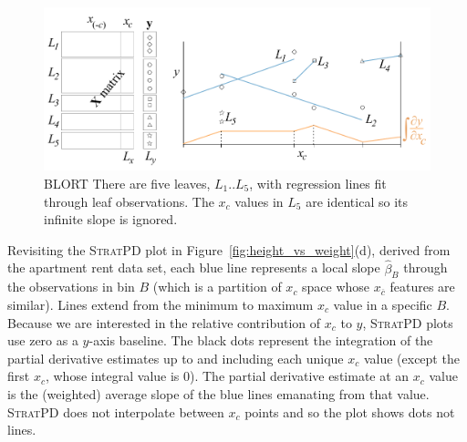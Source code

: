 \documentclass[12pt]{article}
\newcommand{\figref}[1]{Figure~\ref{#1}}
\newcommand{\cut}[1]{}
\newcommand{\spd}{\fontfamily{cmr}\textsc{\small StratPD}}
\newcommand{\xnc}{$x_{\overline{c}}$}
\begin{document}
\begin{figure}[htbp]
\begin{center}
\includegraphics[scale=0.7]{images/leaves.pdf}
\caption{BLORT There are five leaves, $L_1 .. L_5$, with regression lines fit through leaf observations. The $x_c$ values in $L_5$ are identical so its infinite slope is ignored.}
\label{fig:leaves}
\end{center}
\end{figure}

\cut{
\spd{} trains a decision tree in the usual way but on $(x_{\overline{c}}, {\bf y})$ rather than $({\bf X}, {\bf y})$. Observations $(X_i, y_i)$ that end up in a tree leaf are, by definition, in the same region of \xnc{} feature space. Training greedily partitions feature space in order to minimize variance of $y_i$ within regions, which partitions feature space into tighter and tighter regions.  (The collection of variable inequality decision nodes along the path from from root to a leaf demarcates the region of feature space.) Tighter regions imply more similar \xnc{} values, which means $x_c$ is likely responsible for any variation in $y$; this likelihood decreases as the size of $L$ increases.  The training process must leave at least two samples per leaf in order to fit a localized linear model.  
}

Revisiting the \spd{} plot in \figref{fig:height_vs_weight}(d), derived from the apartment rent data set, each blue line represents a local slope $\hat{\beta}_B$ through the observations in bin $B$ (which is a partition of $x_c$ space whose \xnc{} features are similar). Lines extend from the minimum to maximum $x_c$ value in a specific $B$.  Because we are interested in the relative contribution of $x_c$ to $y$, \spd{} plots use zero as a $y$-axis baseline. The black dots represent the integration of the partial derivative estimates up to and including each unique $x_c$ value (except the first $x_c$, whose integral value is 0). The partial derivative estimate at an $x_c$ value is the (weighted) average slope of the blue lines emanating from that value. \spd{} does not interpolate between $x_c$ points and so the plot shows dots not lines. 
\end{document}

